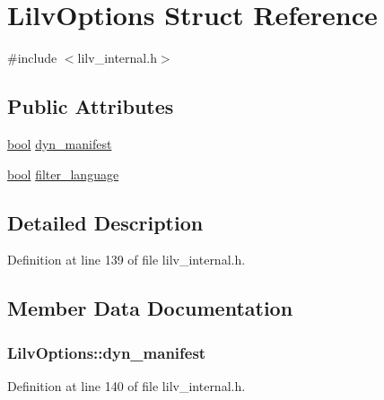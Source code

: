 \hypertarget{struct_lilv_options}{}\section{Lilv\+Options Struct Reference}
\label{struct_lilv_options}


{\ttfamily \#include $<$lilv\+\_\+internal.\+h$>$}

\subsection*{Public Attributes}
\begin{DoxyCompactItemize}
\item 
\hyperlink{mac_2config_2i386_2lib-src_2libsoxr_2soxr-config_8h_abb452686968e48b67397da5f97445f5b}{bool} \hyperlink{struct_lilv_options_a0caf26391fff0c33e974673016dcd236}{dyn\+\_\+manifest}
\item 
\hyperlink{mac_2config_2i386_2lib-src_2libsoxr_2soxr-config_8h_abb452686968e48b67397da5f97445f5b}{bool} \hyperlink{struct_lilv_options_a9f186f30aa1f207befab6836fca11814}{filter\+\_\+language}
\end{DoxyCompactItemize}


\subsection{Detailed Description}


Definition at line 139 of file lilv\+\_\+internal.\+h.



\subsection{Member Data Documentation}
\subsubsection[{\texorpdfstring{dyn\+\_\+manifest}{dyn_manifest}}]{ Lilv\+Options\+::dyn\+\_\+manifest}\hypertarget{struct_lilv_options_a0caf26391fff0c33e974673016dcd236}{}\label{struct_lilv_options_a0caf26391fff0c33e974673016dcd236}


Definition at line 140 of file lilv\+\_\+internal.\+h.

